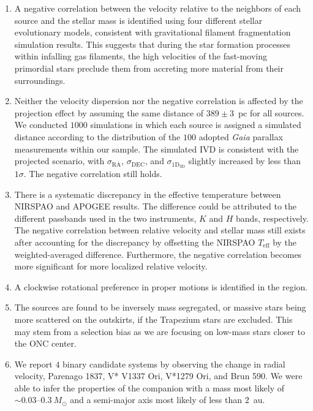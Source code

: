 \documentclass[12pt]{ucsddissertation}
\begin{document}
\begin{CJK*}{UTF8}{gbsn}
\begin{enumerate}
    \item A negative correlation between the velocity relative to the neighbors of each source and the stellar mass is identified using four different stellar evolutionary models, consistent with gravitational filament fragmentation simulation results. This suggests that during the star formation processes within infalling gas filaments, the high velocities of the fast-moving primordial stars preclude them from accreting more material from their surroundings.

    \item Neither the velocity dispersion nor the negative correlation is affected by the projection effect by assuming the same distance of $389\pm3$~pc for all sources. We conducted $1000$ simulations in which each source is assigned a simulated distance according to the distribution of the $100$ adopted \textit{Gaia} parallax measurements within our sample. The simulated IVD is consistent with the projected scenario, with $\sigma_\mathrm{RA}$, $\sigma_\mathrm{DEC}$, and $\sigma_\mathrm{1D_{3D}}$ slightly increased by less than $1\sigma$. The negative correlation still holds.
    
    \item There is a systematic discrepancy in the effective temperature between NIRSPAO and APOGEE results. The difference could be attributed to the different passbands used in the two instruments, $K$ and $H$ bands, respectively. The negative correlation between relative velocity and stellar mass still exists after accounting for the discrepancy by offsetting the NIRSPAO $T_\mathrm{eff}$ by the weighted-averaged difference. Furthermore, the negative correlation becomes more significant for more localized relative velocity.

    \item A clockwise rotational preference in proper motions is identified in the region.

    \item The sources are found to be inversely mass segregated, or massive stars being more scattered on the outskirts, if the Trapezium stars are excluded. This may stem from a selection bias as we are focusing on low-mass stars closer to the ONC center.

    \item We report $4$ binary candidate systems by observing the change in radial velocity, Parenago 1837, V* V1337 Ori, V*1279 Ori, and Brun 590. We were able to infer the properties of the companion with a mass most likely of $\sim0.03$--$0.3~M_\odot$ and a semi-major axis most likely of less than $2$~au.


\end{enumerate}
\end{CJK*}
\end{document}
